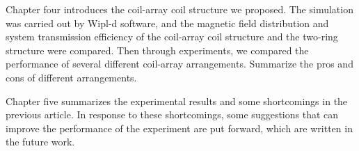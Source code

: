 Chapter four introduces the coil-array coil structure we proposed. The simulation was carried out by Wipl-d software, and the magnetic field distribution and system transmission efficiency of the coil-array coil structure and the two-ring structure were compared. Then through experiments, we compared the performance of several different coil-array arrangements. Summarize the pros and cons of different arrangements.

Chapter five summarizes the experimental results and some shortcomings in the previous article. In response to these shortcomings, some suggestions that can improve the performance of the experiment are put forward, which are written in the future work.